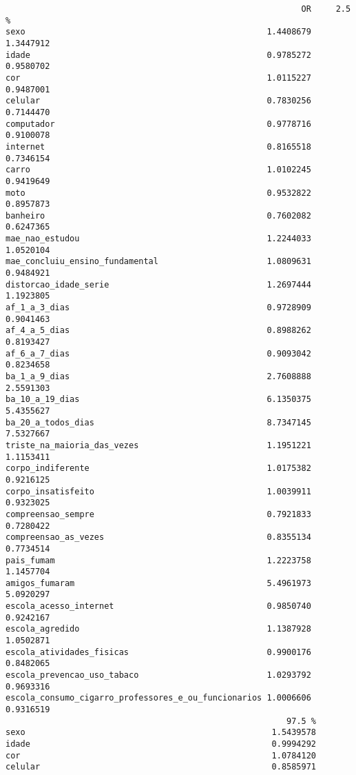 \documentclass[
]{article}
\begin{document}
\begin{verbatim}
                                                            OR     2.5 %
sexo                                                 1.4408679 1.3447912
idade                                                0.9785272 0.9580702
cor                                                  1.0115227 0.9487001
celular                                              0.7830256 0.7144470
computador                                           0.9778716 0.9100078
internet                                             0.8165518 0.7346154
carro                                                1.0102245 0.9419649
moto                                                 0.9532822 0.8957873
banheiro                                             0.7602082 0.6247365
mae_nao_estudou                                      1.2244033 1.0520104
mae_concluiu_ensino_fundamental                      1.0809631 0.9484921
distorcao_idade_serie                                1.2697444 1.1923805
af_1_a_3_dias                                        0.9728909 0.9041463
af_4_a_5_dias                                        0.8988262 0.8193427
af_6_a_7_dias                                        0.9093042 0.8234658
ba_1_a_9_dias                                        2.7608888 2.5591303
ba_10_a_19_dias                                      6.1350375 5.4355627
ba_20_a_todos_dias                                   8.7347145 7.5327667
triste_na_maioria_das_vezes                          1.1951221 1.1153411
corpo_indiferente                                    1.0175382 0.9216125
corpo_insatisfeito                                   1.0039911 0.9323025
compreensao_sempre                                   0.7921833 0.7280422
compreensao_as_vezes                                 0.8355134 0.7734514
pais_fumam                                           1.2223758 1.1457704
amigos_fumaram                                       5.4961973 5.0920297
escola_acesso_internet                               0.9850740 0.9242167
escola_agredido                                      1.1387928 1.0502871
escola_atividades_fisicas                            0.9900176 0.8482065
escola_prevencao_uso_tabaco                          1.0293792 0.9693316
escola_consumo_cigarro_professores_e_ou_funcionarios 1.0006606 0.9316519
                                                         97.5 %
sexo                                                  1.5439578
idade                                                 0.9994292
cor                                                   1.0784120
celular                                               0.8585971

\end{verbatim}
\end{document}
